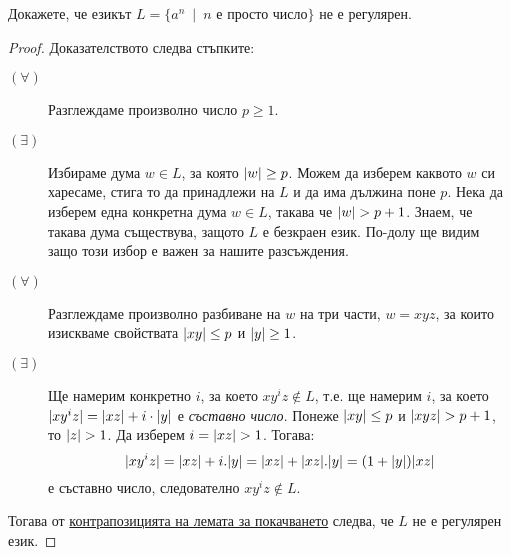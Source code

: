 \begin{extra}
\begin{problem}
  Докажете, че езикът $L = \{a^n\ \mid\ n\mbox{ е просто число}\}$ не е регулярен.
\end{problem}
\begin{proof}
  Доказателството следва стъпките:
  \begin{description}
  \item[$(\forall)$] 
    Разглеждаме произволно число $p \geq 1$.
  \item[$(\exists)$]
    Избираме дума $w \in L$, за която $\vert{w}\vert \geq p$. Можем да изберем каквото $w$ 
    си харесаме, стига то да принадлежи на $L$ и да има дължина поне $p$.
    Нека да изберем една конкретна дума $w \in L$, такава че $\vert{w}\vert > p+1$.
    Знаем, че такава дума съществува, защото $L$ е безкраен език. По-долу ще видим защо този избор е важен за нашите разсъждения.
  \item[$(\forall)$]
    Разглеждаме произволно разбиване на $w$ на три части, $w = xyz$,
    за които изискваме свойствата $\vert{xy}\vert \leq p$ и $\vert{y}\vert \geq 1$.
  \item[$(\exists)$]
    Ще намерим конкретно $i$, за което $xy^iz \not\in L$,
    т.е. ще намерим $i$, за което 
    $\vert{xy^iz}\vert = \vert{xz}\vert + i\cdot\vert{y}\vert$ е {\em съставно число}.
    Понеже $\vert{xy}\vert \leq p$ и $\vert{xyz}\vert > p+1$, то $\vert{z}\vert > 1$.
    Да изберем $i = \vert{xz}\vert > 1$. Тогава:
    \[\vert{xy^iz}\vert = \vert{xz}\vert + i.\vert{y}\vert = \vert{xz}\vert + \vert{xz}\vert.\vert{y}\vert = (1 + \vert{y}\vert)\vert{xz}\vert\] е съставно число, следователно 
    $xy^iz \not\in L$.
  \end{description}
  Тогава от \hyperref[cor:regular:pumping]{контрапозицията на лемата за покачването} следва, че $L$ не е регулярен език.
\end{proof}


\end{extra}

